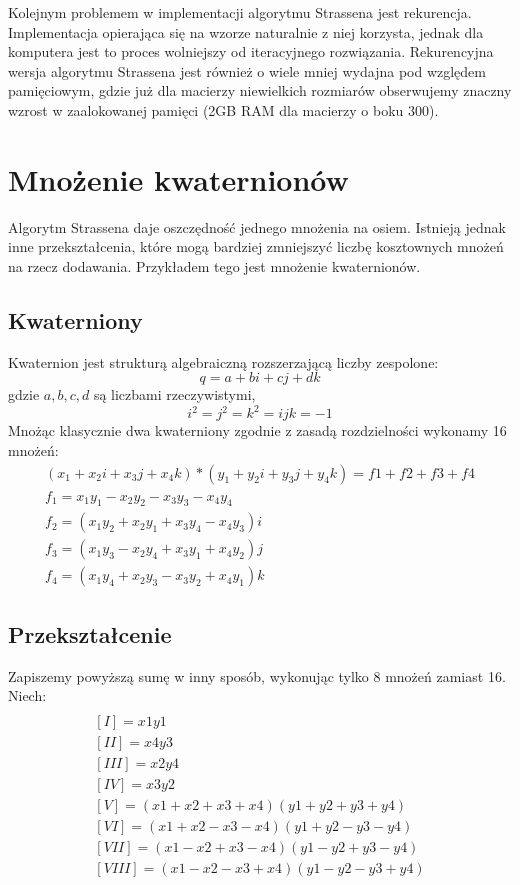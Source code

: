 \documentclass[paper=a4, fontsize=11pt]{scrartcl} %
\numberwithin{equation}{section} %
\numberwithin{figure}{section} %
\numberwithin{table}{section} %
\begin{document}
Kolejnym problemem w implementacji algorytmu Strassena jest rekurencja.
Implementacja opierająca się na wzorze naturalnie z niej korzysta, jednak dla komputera
jest to proces wolniejszy od iteracyjnego rozwiązania. Rekurencyjna wersja algorytmu 
Strassena jest również o wiele mniej wydajna pod względem pamięciowym, gdzie już dla macierzy niewielkich rozmiarów obserwujemy znaczny wzrost w zaalokowanej pamięci 
(2GB RAM dla macierzy o boku 300).

\section{Mnożenie kwaternionów}
Algorytm Strassena daje oszczędność jednego mnożenia na osiem. Istnieją jednak inne przekształcenia,
które mogą bardziej zmniejszyć liczbę kosztownych mnożeń na rzecz dodawania. Przykładem tego jest mnożenie kwaternionów.

\subsection{Kwaterniony}
Kwaternion jest strukturą algebraiczną rozszerzającą liczby zespolone:
\[q = a + bi + cj + dk \]
gdzie ${a,b,c,d}$ są liczbami rzeczywistymi,
 \[i^{2}=j^{2}=k^{2}=ijk=-1 \]
Mnożąc klasycznie dwa kwaterniony zgodnie z zasadą rozdzielności wykonamy 16 mnożeń:\medbreak
\begin{equation}
	\begin{gathered}
	(x_1 + x_2 i + x_3 j + x_4 k ) * (y_1 + y_2 i + y_3 j + y_4 k) = f1 + f2 + f3 + f4 \\
	f_1 = x_1 y_1 - x_2 y_2 - x_3 y_3 - x_4 y_4 \\
	f_2 = (x_1 y_2 + x_2 y_1 + x_3 y_4 - x_4 y_3 ) i \\
	f_3 = ( x_1 y_3 - x_2 y_4 + x_3 y_1 + x_4 y_2 ) j \\
	f_4 = ( x_1 y_4 + x_2 y_3 - x_3 y_2 + x_4 y_1 ) k	
	\end{gathered}
\end{equation}

\subsection{Przekształcenie}
Zapiszemy powyższą sumę w inny sposób, wykonując tylko 8 mnożeń zamiast 16. Niech:
\begin{equation}
\begin{gathered}
\\
[I] = x1 y1 \\ 
[II] = x4 y3 \\ 
[III] = x2 y4 \\
[IV] = x3 y2 \\
[V] = (x1+x2+x3+x4)(y1+y2+y3+y4) \\
[VI] = (x1+x2-x3-x4)(y1+y2-y3-y4) \\
[VII] = (x1-x2+x3-x4)(y1-y2+y3-y4) \\
[VIII] = (x1-x2-x3+x4)(y1-y2-y3+y4) \\
\end{gathered}
\end{equation}
\end{document}
